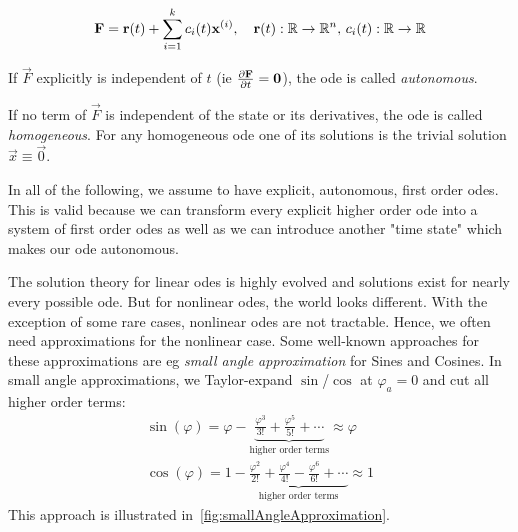 		\begin{align*}
			\boldsymbol{\mathrm{F}} = \boldsymbol{\mathrm{r}}(t) + \sum_{i = 1}^{k} c_i(t) \boldsymbol{\mathrm{x}}^{(i)},\quad \boldsymbol{\mathrm{r}}(t) : \mathbb{R} \to \mathbb{R}^n,\, c_i(t) : \mathbb{R} \to \mathbb{R}
		\end{align*}
		\begin{description}[leftmargin = 3cm]
			\item[Autonomous] If \(\vec{F}\) explicitly is independent of \(t\) (\ac{ie} \( \pdv{\boldsymbol{\mathrm{F}}}{t} = \boldsymbol{\mathrm{0}} \)), the \ac{ode} is called \emph{autonomous}.
			\item[Homogenity] If no term  of \(\vec{F}\) is independent of the state or its derivatives, the \ac{ode} is called \emph{homogeneous}. For any homogeneous \ac{ode} one of its solutions is the trivial solution \( \vec{x} \equiv \vec{0} \).
		\end{description}

		In all of the following, we assume to have explicit, autonomous, first order \acp{ode}. This is valid because we can transform every explicit higher order \ac{ode} into a system of first order \acp{ode} as well as we can introduce another "time state" which makes our \ac{ode} autonomous.

		The solution theory for linear \acp{ode} is highly evolved and solutions exist for nearly every possible \ac{ode}. But for nonlinear \acp{ode}, the world looks different. With the exception of some rare cases, nonlinear \acp{ode} are not tractable. Hence, we often need approximations for the nonlinear case. Some well-known approaches for these approximations are \ac{eg} \emph{small angle approximation} for Sines and Cosines. In small angle approximations, we Taylor-expand \( \sin \)/\( \cos \) at \( \varphi_a = 0 \) and cut all higher order terms:
		\begin{gather*}
			\sin(\varphi) = \varphi - \underbrace{\frac{\varphi^3}{3!} + \frac{\varphi^5}{5!} + \cdots}_\text{higher order terms} \approx \varphi \\
			\cos(\varphi) = 1 - \underbrace{\frac{\varphi^2}{2!} + \frac{\varphi^4}{4!} - \frac{\varphi^6}{6!} + \cdots}_\text{higher order terms} \approx 1
		\end{gather*}
		This approach is illustrated in~\autoref{fig:smallAngleApproximation}.

